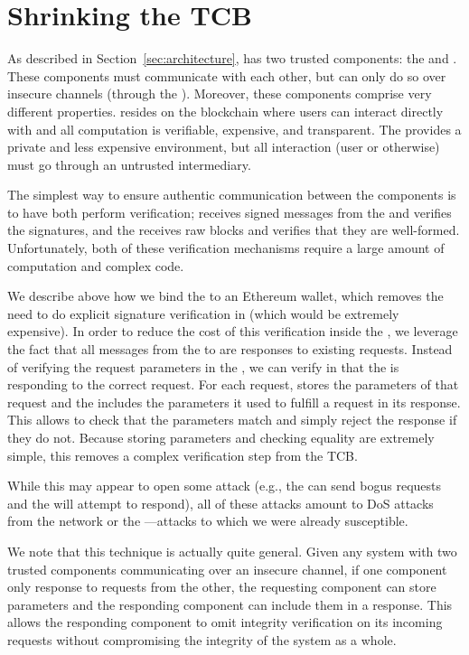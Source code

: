\section{Shrinking the TCB}
\label{sec:shrinking-tcb}

As described in Section~\ref{sec:architecture}, \tc has two trusted components: the \encname and \tcont.
These components must communicate with each other, but can only do so over insecure channels (through the \medname).
Moreover, these components comprise very different properties.
\tcont resides on the blockchain where users can interact directly with \tc and all computation is verifiable, expensive, and transparent.
The \encname provides a private and less expensive environment, but all interaction (user or otherwise) must go through an untrusted intermediary.

The simplest way to ensure authentic communication between the components is to have both perform verification;
\tcont receives signed messages from the \encname and verifies the signatures,
and the \encname receives raw blocks and verifies that they are well-formed.
Unfortunately, both of these verification mechanisms require a large amount of computation and complex code.

We describe above how we bind the \encname to an Ethereum wallet, which removes the need to do explicit signature verification in \tcont (which would be extremely expensive).
In order to reduce the cost of this verification inside the \encname, we leverage the fact that all messages from the \encname to \tcont are responses to existing requests.
Instead of verifying the request parameters in the \encname, we can verify in \tcont that the \encname is responding to the correct request.
For each request, \tcont stores the parameters of that request and the \encname includes the parameters it used to fulfill a request in its response.
This allows \tcont to check that the parameters match and simply reject the response if they do not.
Because storing parameters and checking equality are extremely simple, this removes a complex verification step from the TCB.

While this may appear to open some attack (e.g., the \medname can send bogus requests and the \encname will attempt to respond),
all of these attacks amount to DoS attacks from the network or the \medname---attacks to which we were already susceptible.

We note that this technique is actually quite general.
Given any system with two trusted components communicating over an insecure channel, if one component only response to requests from the other,
the requesting component can store parameters and the responding component can include them in a response.
This allows the responding component to omit integrity verification on its incoming requests without compromising the integrity of the system as a whole.





